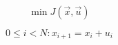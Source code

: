 \documentclass{article}
\begin{document}
\thispagestyle{empty}

$$
\min J(\vec{x},\vec{u})
$$

$$
0\leq i < N : x_{i+1} = x_i + u_i
$$
\end{document}
